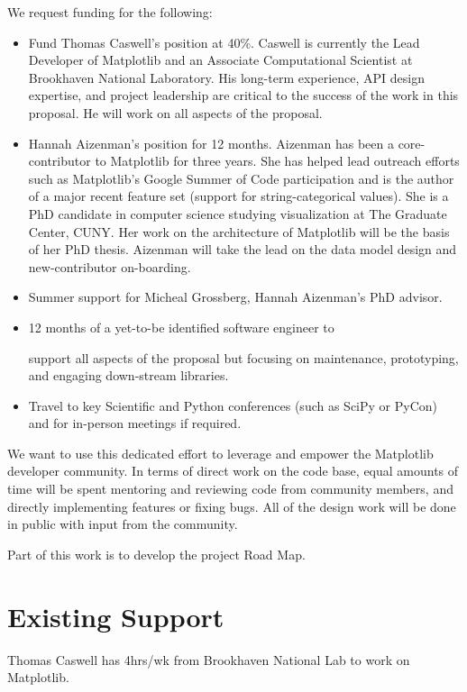 \documentclass[11pt,letterpaper]{article}  %
\begin{document}
We request funding for the following:


\begin{itemize}[noitemsep]

\item Fund Thomas Caswell's position at 40\%.  Caswell is
  currently the Lead Developer of Matplotlib and an Associate
  Computational Scientist at Brookhaven National Laboratory.  His
  long-term experience, API design expertise, and project leadership
  are critical to the success of the work in this proposal.  He will work
  on all aspects of the proposal.
\item Hannah Aizenman's position for 12 months.  Aizenman has
  been a core-contributor to Matplotlib for three years. She has helped lead outreach efforts such as
  Matplotlib's Google Summer of Code participation and is the author of a major recent feature set
  (support for string-categorical values).
  She is a PhD candidate in computer science studying visualization at The
  Graduate Center, CUNY.  Her work on the architecture of
  Matplotlib will be the basis of her PhD thesis.  Aizenman will take
  the lead on the data model design and new-contributor on-boarding.
\item Summer support for Micheal Grossberg, Hannah Aizenman's PhD advisor.
\item 12 months of a yet-to-be identified software engineer to

  support all aspects of the proposal but focusing on maintenance,
  prototyping, and engaging down-stream libraries.
\item Travel to key Scientific and Python conferences (such as SciPy
  or PyCon) and for in-person meetings if required.
\end{itemize}

We want to use this dedicated effort to leverage and empower the
Matplotlib developer community.  In terms of direct work on the code
base, equal amounts of time will be spent mentoring and reviewing
code from community members, and directly implementing features
or fixing bugs.  All of the design work will be done in public with
input from the community.

Part of this work is to develop the project Road Map.



\section{Existing Support}

Thomas Caswell has 4hrs/wk from Brookhaven National Lab to work on
Matplotlib.


\clearpage

\end{document}
